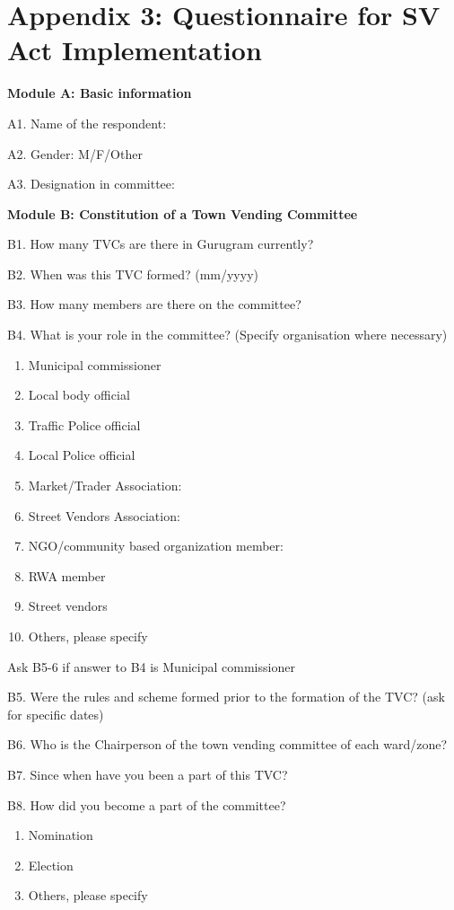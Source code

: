 \documentclass[a4paper, 12pt, twoside]{article}
\begin{document}
{{%
\newpage
\section*{Appendix 3: Questionnaire for SV Act Implementation}
\label{sec: Appendix 5}


\begin{mdframed}[backgroundcolor=gray!20]
\textbf{Module A: Basic information}

A1. Name of the respondent: 

A2. Gender: M/F/Other

A3. Designation in committee:


\textbf{Module B: Constitution of a Town Vending Committee}

B1. How many TVCs are there in Gurugram currently?

B2. When was this TVC formed? (mm/yyyy)

B3. How many members are there on the committee?

B4. What is your role in the committee? (Specify organisation where necessary)

\begin{enumerate}[nosep]
\item Municipal commissioner
\item Local body official
\item Traffic Police official
\item Local Police official
\item Market/Trader Association:
\item Street Vendors Association:
\item NGO/community based organization member:
\item RWA member
\item Street vendors
\item Others, please specify
\end{enumerate}

Ask B5-6 if answer to B4 is Municipal commissioner

B5. Were the rules and scheme formed prior to the formation of the TVC? (ask for specific dates)

B6. Who is the Chairperson of the town vending committee of each ward/zone?

B7. Since when have you been a part of this TVC?

B8. How did you become a part of the committee?
\begin{enumerate}[nosep]
\item Nomination
\item Election
\item Others, please specify
\end{enumerate}


\end{mdframed}}}
\end{document}
